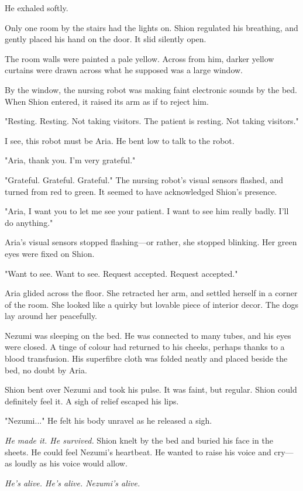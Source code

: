 He exhaled softly.

Only one room by the stairs had the lights on. Shion regulated his
breathing, and gently placed his hand on the door. It slid silently
open.

The room walls were painted a pale yellow. Across from him, darker
yellow curtains were drawn across what he supposed was a large window.

By the window, the nursing robot was making faint electronic sounds by
the bed. When Shion entered, it raised its arm as if to reject him.

{\sffamily "Resting. Resting. Not taking visitors. The patient is resting. Not
	taking visitors."}

I see, this robot must be Aria. He bent low to talk to the robot.

"Aria, thank you. I'm very grateful."

{\sffamily "Grateful. Grateful. Grateful."} The nursing robot's visual sensors
flashed, and turned from red to green. It seemed to have acknowledged
Shion's presence.

{\sffamily "Aria, I want you to let me see your patient. I want to see him really
	badly. I'll do anything."}

Aria's visual sensors stopped flashing---or rather, she stopped blinking.
Her green eyes were fixed on Shion.

"Want to see. Want to see. Request accepted. Request accepted."

Aria glided across the floor. She retracted her arm, and settled herself
in a corner of the room. She looked like a quirky but lovable piece of
interior decor. The dogs lay around her peacefully.

Nezumi was sleeping on the bed. He was connected to many tubes, and his
eyes were closed. A tinge of colour had returned to his cheeks, perhaps
thanks to a blood transfusion. His superfibre cloth was folded neatly
and placed beside the bed, no doubt by Aria.

Shion bent over Nezumi and took his pulse. It was faint, but regular.
Shion could definitely feel it. A sigh of relief escaped his lips.

"Nezumi..." He felt his body unravel as he released a sigh.

\emph{He made it. He survived.} Shion knelt by the bed and buried his face in
the sheets. He could feel Nezumi's heartbeat. He wanted to raise his
voice and cry---as loudly as his voice would allow.

\emph{He's alive. He's alive. Nezumi's alive.}

